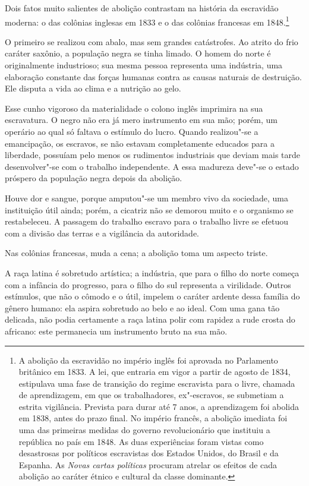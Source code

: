 Dois fatos muito salientes de abolição contrastam na história da
escravidão moderna: o das colônias inglesas em 1833 e o das colônias
francesas em
1848.\footnote{ A abolição da escravidão no império inglês foi aprovada no Parlamento britânico em \label{nota1}
1833. A lei, que entraria em vigor a partir de agosto de 1834,
estipulava uma fase de transição do regime escravista para o livre,
chamada de aprendizagem, em que os trabalhadores, ex"-escravos, se
submetiam a estrita vigilância. Prevista para durar até 7 anos, a
aprendizagem foi abolida em 1838, antes do prazo final. No império
francês, a abolição imediata foi uma das primeiras medidas do governo
revolucionário que instituiu a república no país em 1848. As duas
experiências foram vistas como desastrosas por políticos escravistas
dos Estados Unidos, do Brasil e da Espanha. As \textit{Novas cartas
políticas} procuram atrelar os efeitos de cada abolição ao caráter
étnico e cultural da classe dominante.}
 
O primeiro se realizou com abalo, mas sem grandes catástrofes. Ao atrito
do frio caráter saxônio, a população negra se tinha limado. O homem do
norte é originalmente industrioso; sua mesma pessoa representa uma
indústria, uma elaboração constante das forças humanas contra as causas
naturais de destruição. Ele disputa a vida ao clima e a nutrição ao gelo. 

Esse cunho vigoroso da materialidade o colono inglês imprimira na sua
escravatura. O negro não era já mero instrumento em sua mão; porém, um
operário ao qual só faltava o estímulo do lucro. Quando realizou"-se a
emancipação, os escravos, se não estavam completamente educados para a
liberdade, possuíam pelo menos os rudimentos industriais que deviam
mais tarde desenvolver"-se com o trabalho independente. A essa
madureza deve"-se o estado próspero da população negra depois da abolição.

Houve dor e sangue, porque amputou"-se um membro vivo da sociedade, uma
instituição útil ainda; porém, a cicatriz não se demorou muito e o
organismo se restabeleceu. A passagem do trabalho escravo para o
trabalho livre se efetuou com a divisão das terras e a vigilância da autoridade. 

Nas colônias francesas, muda a cena; a abolição toma um aspecto triste.

A raça latina é sobretudo artística; a indústria, que para o filho do
norte começa com a infância do progresso, para o filho do sul
representa a virilidade. Outros estímulos, que não o cômodo e o útil,
impelem o caráter ardente dessa família do gênero humano: ela aspira
sobretudo ao belo e ao ideal. Com uma gana tão delicada, não podia
certamente a raça latina polir com rapidez a rude crosta do africano:
este permanecia um instrumento bruto na sua mão. 

